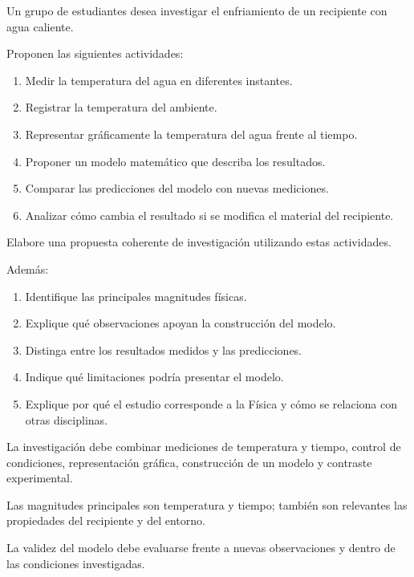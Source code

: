 \begin{ejercicio}
Un grupo de estudiantes desea investigar el enfriamiento de un recipiente con agua caliente.

Proponen las siguientes actividades:

\begin{enumerate}[label=\alph*)]
    \item Medir la temperatura del agua en diferentes instantes.
    \item Registrar la temperatura del ambiente.
    \item Representar gráficamente la temperatura del agua frente al tiempo.
    \item Proponer un modelo matemático que describa los resultados.
    \item Comparar las predicciones del modelo con nuevas mediciones.
    \item Analizar cómo cambia el resultado si se modifica el material del recipiente.
\end{enumerate}

Elabore una propuesta coherente de investigación utilizando estas actividades.

Además:

\begin{enumerate}[label=\alph*)]
    \item Identifique las principales magnitudes físicas.
    \item Explique qué observaciones apoyan la construcción del modelo.
    \item Distinga entre los resultados medidos y las predicciones.
    \item Indique qué limitaciones podría presentar el modelo.
    \item Explique por qué el estudio corresponde a la Física y cómo se relaciona con otras disciplinas.
\end{enumerate}
\end{ejercicio}

\begin{respuesta}
La investigación debe combinar mediciones de temperatura y tiempo, control de condiciones, representación gráfica, construcción de un modelo y contraste experimental.

Las magnitudes principales son temperatura y tiempo; también son relevantes las propiedades del recipiente y del entorno.

La validez del modelo debe evaluarse frente a nuevas observaciones y dentro de las condiciones investigadas.
\end{respuesta}

